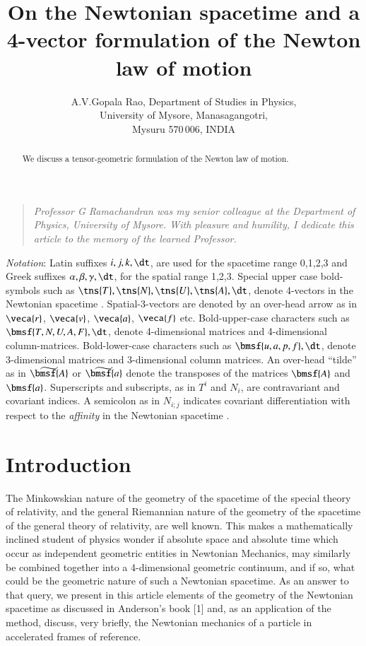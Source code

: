 \documentclass[10pt]{article}
\begin{document}
\title{\bf On the Newtonian spacetime and a                
4-vector formulation of the Newton law of motion}           
 
   

\author{A.V.Gopala Rao,                                  
Department of  Studies in Physics,\\ University of Mysore, 
Manasagangotri,\\  Mysuru 570\,006, INDIA}
\maketitle
\begin{abstract} 
We discuss a tensor-geometric formulation of the 
Newton law of motion. 
\end{abstract} 

\begin{quote}
\textsl{\small Professor G Ramachandran was my senior 
colleague at the Department of Physics, 
University of Mysore. With pleasure and humility, 
I dedicate this article to the memory of the learned 
Professor.}
\end{quote}

\textsl{Notation}: Latin suffixes  $i,j,k,\dt$, are used 
for 
the spacetime range 0,1,2,3 and Greek suffixes  $\alpha, 
\beta, \gamma, \dt$,  for the spatial  range 1,2,3. Special 
upper case bold-symbols such as $\tns{T}, \tns{N}, 
\tns{U},\tns{A},\dt$,  denote 4-vectors in the Newtonian 
spacetime .  Spatial-3-vectors are denoted by an 
over-head arrow as in $\veca{r}$,  $\veca{v}$,  $\veca{a}$, 
$\veca{f}$ etc. Bold-upper-case characters such as 
$\bmsf{T,N,U,A,F},\dt$, denote 4-dimensional matrices and 
4-dimensional column-matrices. Bold-lower-case characters 
such as $\bmsf{u,a,p,f},\dt$, denote 3-dimensional matrices 
and 3-dimensional column matrices.  An over-head ``tilde'' 
as in $\wt{\bmsf{A}}$ or  $\wt{\bmsf{a}}$ denote the 
transposes 
of the matrices  $\bmsf{A}$ and $\bmsf{a}$. Superscripts 
and 
subscripts, as in  $T^i$ and  $N_i$, are contravariant and 
covariant indices. A semicolon as in $N_{i;j}$ indicates  
covariant differentiation with respect to the 
\textsl{affinity} in the Newtonian spacetime . 

\section{Introduction} 
The Minkowskian nature of the geometry of the spacetime of 
the special theory of relativity, and the general 
Riemannian 
nature of the geometry of the spacetime of the general 
theory of relativity, are well known. This makes a 
mathematically inclined student of physics  wonder if 
absolute space and absolute time which occur as independent 
geometric entities in Newtonian Mechanics, may similarly be 
combined together into a 4-dimensional geometric continuum, 
and if so, what could be the geometric nature of such a  
Newtonian spacetime. As an  answer to that query, we present 
in this article elements of the geometry of the Newtonian 
spacetime as discussed in Anderson's book [1] and, as an 
application of the method, discuss, very briefly, the 
Newtonian mechanics of a particle in accelerated frames of 
reference.
\end{document}
